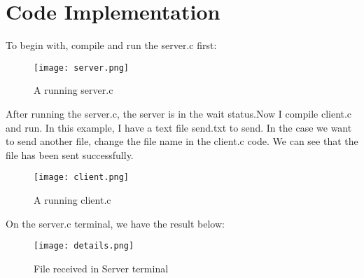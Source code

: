 \documentclass{article}
\begin{document}
\section{Code Implementation}
To begin with, compile and run the server.c first:
\begin{figure}[H]
    \centering
    \texttt{[image: server.png]}
    \caption{A running server.c}
\end{figure}
After running the server.c, the server is in the wait status.Now I compile client.c and run. In this example, I have a text file send.txt to send. In the case we want to send another file, change the file name in the client.c code. We can see that the file has been sent successfully.
\begin{figure}[H]
    \centering
    \texttt{[image: client.png]}
    \caption{A running client.c}
\end{figure}
On the server.c terminal, we have the result below:
\begin{figure}[H]
    \centering
    \texttt{[image: details.png]}
    \caption{File received in Server terminal}
\end{figure}
\end{document}
